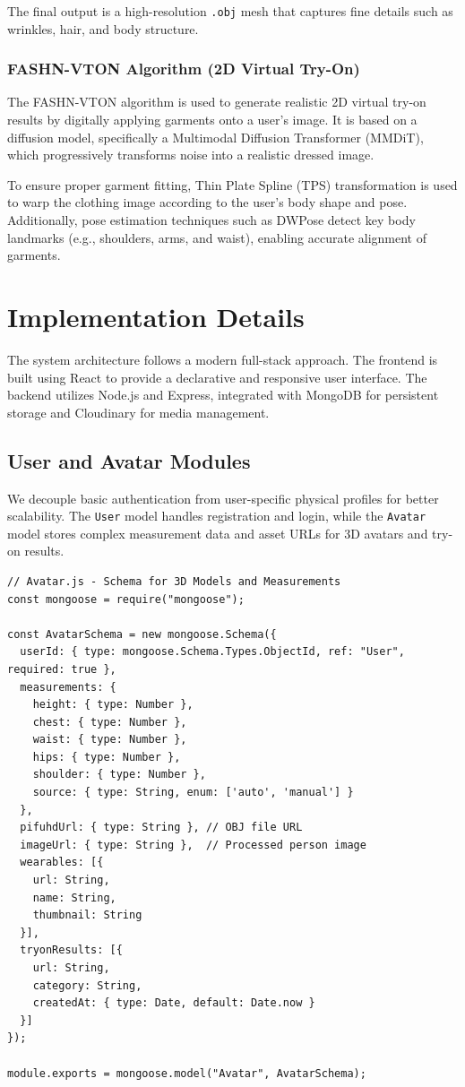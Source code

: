\documentclass[12pt,a4paper,oneside]{report}
\begin{document}
The final output is a high-resolution \texttt{.obj} mesh that captures fine details such as wrinkles, hair, and body structure.



\subsubsection{FASHN-VTON Algorithm (2D Virtual Try-On)}
The FASHN-VTON algorithm is used to generate realistic 2D virtual try-on results by digitally applying garments onto a user’s image. It is based on a diffusion model, specifically a Multimodal Diffusion Transformer (MMDiT), which progressively transforms noise into a realistic dressed image.

To ensure proper garment fitting, Thin Plate Spline (TPS) transformation is used to warp the clothing image according to the user’s body shape and pose. Additionally, pose estimation techniques such as DWPose detect key body landmarks (e.g., shoulders, arms, and waist), enabling accurate alignment of garments.

\section{Implementation Details}
The system architecture follows a modern full-stack approach. The frontend is built using React to provide a declarative and responsive user interface. The backend utilizes Node.js and Express, integrated with MongoDB for persistent storage and Cloudinary for media management.

\subsection{User and Avatar Modules}
We decouple basic authentication from user-specific physical profiles for better scalability. The \texttt{User} model handles registration and login, while the \texttt{Avatar} model stores complex measurement data and asset URLs for 3D avatars and try-on results.

\begin{verbatim}
// Avatar.js - Schema for 3D Models and Measurements
const mongoose = require("mongoose");

const AvatarSchema = new mongoose.Schema({
  userId: { type: mongoose.Schema.Types.ObjectId, ref: "User", required: true },
  measurements: {
    height: { type: Number },
    chest: { type: Number },
    waist: { type: Number },
    hips: { type: Number },
    shoulder: { type: Number },
    source: { type: String, enum: ['auto', 'manual'] }
  },
  pifuhdUrl: { type: String }, // OBJ file URL
  imageUrl: { type: String },  // Processed person image
  wearables: [{
    url: String,
    name: String,
    thumbnail: String
  }],
  tryonResults: [{
    url: String,
    category: String,
    createdAt: { type: Date, default: Date.now }
  }]
});

module.exports = mongoose.model("Avatar", AvatarSchema);
\end{verbatim}
\end{document}
